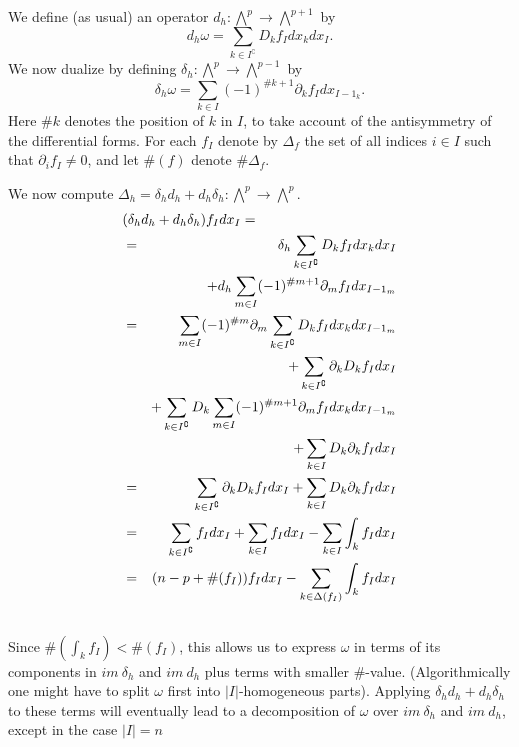 We define (as usual) an operator \( d_h : \bigwedge^p \longrightarrow
\bigwedge^{p+1} \)
by \[ d_h \omega = \sum_{k \in I^\complement} D_k f_I dx_k dx_I .\]
We now dualize by defining \( \delta_h : \bigwedge^p \longrightarrow
\bigwedge^{p-1} \) by
\[\delta_h \omega = \sum_{k \in I} (-1)^{\#k+1} \partial_k f_I dx_{I-1_k} .\]
Here \( \#k \) denotes the position of \( k \) in \(I\),
to take account of the antisymmetry of the differential forms.
For each \(f_I\) denote by \(\Delta_f\) the set of all indices
\( i \in I \) such that \( \partial_i f_I \neq 0 \),
and let \( \#(f) \) denote \( \# \Delta_f \).

We now compute \( \Delta_h = \delta_h d_h + d_h \delta_h : \bigwedge^p
\longrightarrow \bigwedge^p \).
\begin{eqnarray}\nonumber
\lefteqn{ ( \delta_h d_h +d_h \delta_h  ) f_I dx_{I} = }\\\nonumber
&=& \delta_h \sum_{k \in I^\complement} D_k f_I dx_k dx_{I} \\\nonumber
&&+ d_h \sum_{m \in I} (-1)^{\#m+1}\partial_m f_I dx_{I-1_m} \\\nonumber
&=& \sum_{m \in I} (-1)^{\#m} \partial_m  \sum_{k \in I^\complement} D_k f_I  
dx_k dx_{I-1_m} \\\nonumber
&&+  \sum_{k \in I^\complement} \partial_k D_k f_I dx_{I} \\\nonumber
&&+ \sum_{k \in I^\complement} D_k \sum_{m \in I}(-1)^{\#m+1} \partial_m f_I  
dx_k dx_{I-1_m} \\\nonumber
&&+ \sum_{k \in I} D_k \partial_k f_I dx_{I} \\\nonumber
&=& \sum_{k \in I^\complement} \partial_k D_k f_I dx_{I}
+ \sum_{k \in I} D_k \partial_k f_I dx_{I} \\\nonumber
&=& \sum_{k \in I^\complement} f_I dx_{I}
+ \sum_{k \in I} f_I dx_{I}
- \sum_{k \in I} \int_k f_I dx_{I} \\\nonumber
&=& ( n-p + \#(f_I) )  f_I dx_I
- \sum_{k \in \Delta(f_I) } \int_k f_I dx_{I} \\\nonumber
\end{eqnarray}
Since \( \#(\int_k f_I) < \#(f_I) \),
this allows us to express \(\omega\) in terms
of its components in \( im \ \delta_h \) and \( im\  d_h \) plus
terms with smaller \( \# \)-value.
(Algorithmically one might have to split \(\omega\) first
into \(  |I|\)-homogeneous parts).
Applying \( \delta_h d_h + d_h \delta_h \) to these terms will
eventually lead to a decomposition of \( \omega \) over
\( im \ \delta_h \) and \( im \ d_h \),
except in the case \( | I|=n \)
